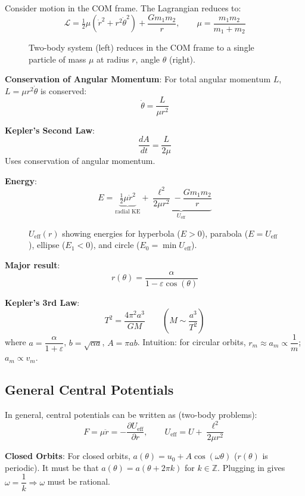 Consider motion in the COM frame. The Lagrangian reduces to:
\[
    \mathcal{L} = \tfrac{1}{2}\mu(\dot r^2 + r^2\dot\theta^2) + \frac{Gm_1 m_2}{r},
    \qquad \mu = \frac{m_1 m_2}{m_1 + m_2}
\]

\begin{figure}[H]
\centering
\caption{Two-body system (left) reduces in the COM frame to a single particle of mass $\mu$ at radius $r$, angle $\theta$ (right).}
\end{figure}

\textbf{Conservation of Angular Momentum}: For total angular momentum $L$, $L = \mu r^2\dot\theta$ is conserved:
\[
    \boxed{\dot\theta = \frac{L}{\mu r^2}}
\]

\textbf{Kepler's Second Law}:
\[
    \frac{dA}{dt} = \frac{L}{2\mu}
\]
Uses conservation of angular momentum.

\textbf{Energy}:
\[
    E = \underbrace{\tfrac{1}{2}\mu\dot r^2}_{\text{radial KE}} + \underbrace{\frac{\ell^2}{2\mu r^2} - \frac{Gm_1 m_2}{r}}_{U_\text{eff}}
\]

\begin{figure}[H]
\centering
\caption{$U_\text{eff}(r)$ showing energies for hyperbola ($E>0$), parabola ($E=U_\text{eff}$), ellipse ($E_1 < 0$), and circle ($E_0 = \min U_\text{eff}$).}
\end{figure}

\textbf{Major result}:
\[
    r(\theta) = \frac{\alpha}{1 - \varepsilon\cos(\theta)}
\]

\textbf{Kepler's 3rd Law}:
\[
    T^2 = \frac{4\pi^2 a^3}{GM} \qquad \left(M \sim \frac{a^3}{T^2}\right)
\]
where $a = \dfrac{\alpha}{1+\varepsilon}$, $b = \sqrt{\alpha a}$, $A = \pi ab$. Intuition: for circular orbits, $r_m \approx a_m \propto \dfrac{1}{m}$; $a_m \propto v_m$.

\subsection{General Central Potentials}

In general, central potentials can be written as (two-body problems):
\[
    F = \mu\ddot r = -\frac{\partial U_\text{eff}}{\partial r},
    \qquad U_\text{eff} = U + \frac{\ell^2}{2\mu r^2}
\]

\textbf{Closed Orbits}: For closed orbits, $a(\theta) = u_0 + A\cos(\omega\theta)$ ($r(\theta)$ is periodic). It must be that $a(\theta) = a(\theta + 2\pi k)$ for $k\in\mathbb{Z}$. Plugging in gives $\omega = \dfrac{1}{k} \Rightarrow \omega$ must be rational.

